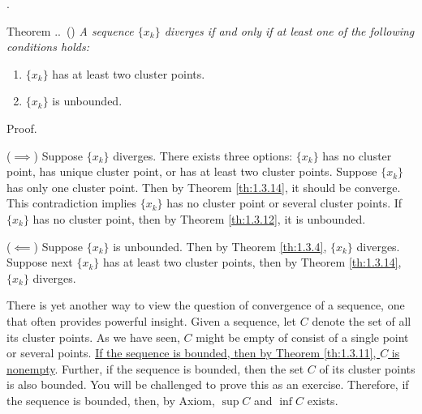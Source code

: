 \documentclass[8pt]{beamer}
\newcounter{thm}
\newcounter{ex}
\newcounter{exer}
\renewcommand{\thethm}{\thesection.\thesubsection.\arabic{thm}}
\renewenvironment{theorem}[1][]{%
    \refstepcounter{thm}%
    \begin{block}{Theorem \thethm\if\relax\detokenize{#1}\relax\else\ (#1)\fi}%
    \itshape
}{%
    \end{block}%
}
\begin{document}
\begin{frame}{.}
    \begin{theorem} \label{th:1.3.15}
        A sequence $\{x_k\}$ diverges if and only if at least one of the following conditions holds:
        \begin{enumerate}
            \item $\{x_k\}$ has at least two cluster points.
            \item $\{x_k\}$ is unbounded.
        \end{enumerate}

        Proof.

        ($\implies$) Suppose $\{x_k\}$ diverges.
        There exists three options: $\{x_k\}$ has no cluster point, has unique cluster point, or has at least two cluster points.
        Suppose $\{x_k\}$ has only one cluster point.
        Then by Theorem \ref{th:1.3.14}, it should be converge.
        This contradiction implies $\{x_k\}$ has no cluster point or several cluster points.
        If $\{x_k\}$ has no cluster point, then by Theorem \ref{th:1.3.12}, it is unbounded.

        ($\impliedby$) Suppose $\{x_k\}$ is unbounded. Then by Theorem \ref{th:1.3.4}, $\{x_k\}$ diverges.
        Suppose next $\{x_k\}$ has at least two cluster points, then by Theorem \ref{th:1.3.14}, $\{x_k\}$ diverges.
    \end{theorem}

    \bigskip
    There is yet another way to view the question of convergence of a sequence, one that often provides powerful insight.
    Given a sequence, let $C$ denote the set of all its cluster points.
    As we have seen, $C$ might be empty of consist of a single point or several points.
    \underline{If the sequence is bounded, then by Theorem \ref{th:1.3.11}, $C$ is nonempty}.
    Further, if the sequence is bounded, then the set $C$ of its cluster points is also bounded.
    You will be challenged to prove this as an exercise.
    Therefore, if the sequence is bounded, then, by Axiom, $\sup C$ and $\inf C$ exists.
\end{frame}
\end{document}
